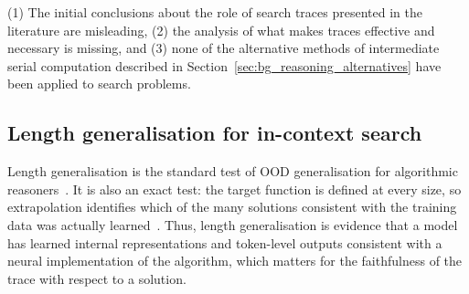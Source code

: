 \begin{tcolorbox}[title=Gap 2: Trace structure, colback=ThesisOrange!5, colframe=ThesisOrange, fonttitle=\bfseries, fontupper=\itshape]
(1) The initial conclusions about the role of search traces presented in the literature are misleading, (2) the analysis of what makes traces effective and necessary is missing, and (3) none of the alternative methods of intermediate serial computation described in Section~\ref{sec:bg_reasoning_alternatives} have been applied to search problems.
\end{tcolorbox}

\subsection{Length generalisation for in-context search}
\label{sec:bg_gap_length}

Length generalisation is the standard test of OOD generalisation for algorithmic reasoners~\citep{anilExploringLengthGeneralization,velickovicCLRSAlgorithmicReasoning2022}.
It is also an exact test: the target function is defined at every size, so extrapolation identifies which of the many solutions consistent with the training data was actually learned~\citep{zhouWhatAlgorithmsCan2023,anilExploringLengthGeneralization}.
Thus, length generalisation is evidence that a model has learned internal representations and token-level outputs consistent with a neural implementation of the algorithm, which matters for the faithfulness of the trace with respect to a solution.

